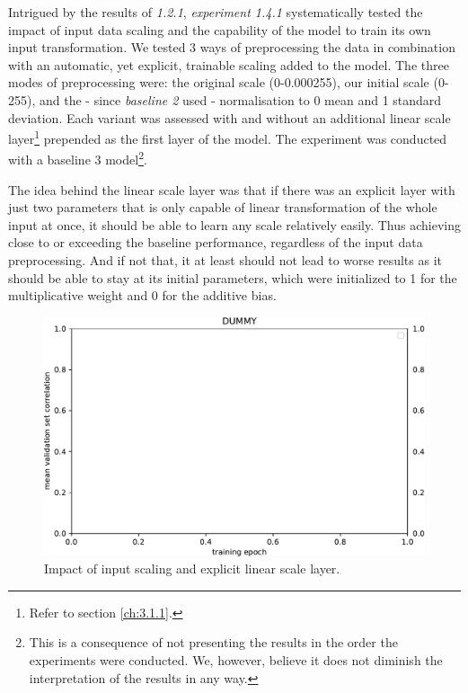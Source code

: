 Intrigued by the results of \textit{1.2.1}, \textit{experiment 1.4.1} systematically tested the impact of input data scaling and the capability of the model to train its own input transformation. We tested 3 ways of preprocessing the data in combination with an automatic, yet explicit, trainable scaling added to the model. The three modes of preprocessing were: the original scale (0-0.000255), our initial scale (0-255), and the - since \textit{baseline 2} used - normalisation to 0 mean and 1 standard deviation. Each variant was assessed with and without an additional linear scale layer\footnote{Refer to section \ref{ch:3.1.1}.} prepended as the first layer of the model. The experiment was conducted with a baseline 3 model\footnote{This is a consequence of not presenting the results in the order the experiments were conducted. We, however, believe it does not diminish the interpretation of the results in any way.}.

The idea behind the linear scale layer was that if there was an explicit layer with just two parameters that is only capable of linear transformation of the whole input at once, it should be able to learn any scale relatively easily. Thus achieving close to or exceeding the baseline performance, regardless of the input data preprocessing. And if not that, it at least should not lead to worse results as it should be able to stay at its initial parameters, which were initialized to 1 for the multiplicative weight and 0 for the additive bias.

\begin{figure}[H]
    \centering
    \includegraphics[width=1\textwidth]{../figures/05_dummy}
    \caption[Experiment 1.4.1]{Impact of input scaling and explicit linear scale layer.}
    \label{fig:5.1.4.1}
\end{figure}


